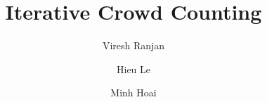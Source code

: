 \documentclass[runningheads]{llncs}
\begin{document}
\title{Iterative Crowd Counting} 



\author{Viresh Ranjan \and Hieu Le \and Minh Hoai}






\def\mA{\mathcal{A}}
\def\mB{\mathcal{B}}
\def\mC{\mathcal{C}}
\def\mD{\mathcal{D}}
\def\mE{\mathcal{E}}
\def\mF{\mathcal{F}}
\def\mG{\mathcal{G}}
\def\mH{\mathcal{H}}
\def\mI{\mathcal{I}}
\def\mJ{\mathcal{J}}
\def\mK{\mathcal{K}}
\def\mL{\mathcal{L}}
\def\mM{\mathcal{M}}
\def\mN{\mathcal{N}}
\def\mO{\mathcal{O}}
\def\mP{\mathcal{P}}
\def\mQ{\mathcal{Q}}
\def\mR{\mathcal{R}}
\def\mS{\mathcal{S}}
\def\mT{\mathcal{T}}
\def\mU{\mathcal{U}}
\def\mV{\mathcal{V}}
\def\mW{\mathcal{W}}
\def\mX{\mathcal{X}}
\def\mY{\mathcal{Y}}
\def\mZ{\mathcal{Z}} 

 

\def\1n{\mathbf{1}_n}
\def\0{\mathbf{0}}
\def\1{\mathbf{1}}


\def\A{{\bf A}}
\def\B{{\bf B}}
\def\C{{\bf C}}
\def\D{{\bf D}}
\def\E{{\bf E}}
\def\F{{\bf F}}
\def\G{{\bf G}}
\def\H{{\bf H}}
\def\I{{\bf I}}
\def\J{{\bf J}}
\def\K{{\bf K}}
\def\L{{\bf L}}
\def\M{{\bf M}}
\def\N{{\bf N}}
\def\O{{\bf O}}
\def\P{{\bf P}}
\def\Q{{\bf Q}}
\def\R{{\bf R}}
\def\S{{\bf S}}
\def\T{{\bf T}}
\def\U{{\bf U}}
\def\V{{\bf V}}
\def\W{{\bf W}}
\def\X{{\bf X}}
\def\Y{{\bf Y}}
\def\Z{{\bf Z}}

\def\a{{\bf a}}
\def\b{{\bf b}}
\def\c{{\bf c}}
\def\d{{\bf d}}
\def\e{{\bf e}}
\def\f{{\bf f}}
\def\g{{\bf g}}
\def\h{{\bf h}}
\def\i{{\bf i}}
\def\j{{\bf j}}
\def\k{{\bf k}}
\def\l{{\bf l}}
\def\m{{\bf m}}
\def\n{{\bf n}}
\def\o{{\bf o}}
\def\p{{\bf p}}
\def\q{{\bf q}}
\def\r{{\bf r}}
\def\s{{\bf s}}
\def\t{{\bf t}}
\def\u{{\bf u}}
\def\v{{\bf v}}
\def\w{{\bf w}}
\def\x{{\bf x}}
\def\y{{\bf y}}
\def\z{{\bf z}}

\def\balpha{\mbox{\boldmath{$\alpha$}}}
\def\bbeta{\mbox{\boldmath{$\beta$}}}
\def\bdelta{\mbox{\boldmath{$\delta$}}}
\def\bgamma{\mbox{\boldmath{$\gamma$}}}
\def\blambda{\mbox{\boldmath{$\lambda$}}}
\def\bsigma{\mbox{\boldmath{$\sigma$}}}
\def\btheta{\mbox{\boldmath{$\theta$}}}
\def\bomega{\mbox{\boldmath{$\omega$}}}
\def\bxi{\mbox{\boldmath{$\xi$}}}
\def\bnu{\mbox{\boldmath{$\nu$}}}                                  
\def\bphi{\mbox{\boldmath{$\phi$}}}
\def\bmu{\mbox{\boldmath{$\mu$}}}
\end{document}

